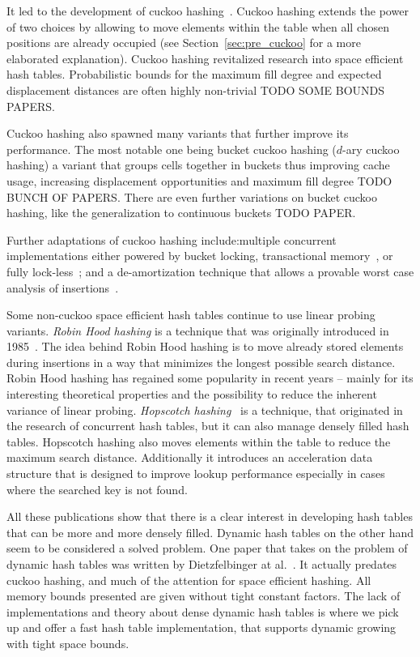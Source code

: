 \documentclass[a4paper,UKenglish]{lipics-v2016}
\begin{document}
It led to the development of cuckoo hashing~\cite{CuckooHashing}.
Cuckoo hashing extends the power of two choices by allowing to move
elements within the table when all chosen positions are already
occupied (see Section~\ref{sec:pre_cuckoo} for a more elaborated
explanation).  Cuckoo hashing revitalized research into space
efficient hash tables.  Probabilistic bounds for the maximum fill
degree and expected displacement distances are often highly
non-trivial TODO SOME BOUNDS PAPERS.

Cuckoo hashing also spawned many variants that further improve its
performance.  The most notable one being bucket cuckoo hashing
($d$-ary cuckoo hashing) a variant that groups cells together in
buckets thus improving cache usage, increasing displacement
opportunities and maximum fill degree TODO BUNCH OF PAPERS.  There are
even further variations on bucket cuckoo hashing, like the
generalization to continuous buckets TODO PAPER.

Further adaptations of cuckoo hashing include:multiple concurrent implementations either powered by bucket
locking, transactional
memory~\cite{AlgorithmicImprovementsForFastConcurrentCuckooHashing},
or fully lock-less~\cite{LockFreeCuckooHashing}; and a de-amortization
technique that allows a provable worst case analysis of
insertions~\cite{UsingAQueueToDeAmortizeCuckooHashingInHardware,
  DeAmortizedCuckooHashingProvableWorstCasePerformanceAndExperimentalResults}.

Some non-cuckoo space efficient hash tables continue to use linear
probing variants.  \emph{Robin Hood hashing} is a technique that was
originally introduced in 1985~\cite{RobinHoodHashing}. The idea behind
Robin Hood hashing is to move already stored elements during
insertions in a way that minimizes the longest possible search
distance.  Robin Hood hashing has regained some popularity in recent
years -- mainly for its interesting theoretical properties and the
possibility to reduce the inherent variance of linear probing.
\emph{Hopscotch hashing}~\cite{HopscotchHashing} is a technique, that
originated in the research of concurrent hash tables, but it can also
manage densely filled hash tables.  Hopscotch hashing also moves
elements within the table to reduce the maximum search distance.
Additionally it introduces an acceleration data structure that is
designed to improve lookup performance especially in cases where the
searched key is not found.

All these publications show that there is a clear interest in
developing hash tables that can be more and more densely filled.
Dynamic hash tables on the other hand seem to be considered a solved
problem.  One paper that takes on the problem of dynamic hash tables
was written by Dietzfelbinger at
al.~\cite{DynamicPerfectHashingUpperAndLowerBounds}.  It actually
predates cuckoo hashing, and much of the attention for space efficient
hashing.  All memory bounds presented are given without tight constant
factors.  The lack of implementations and theory about dense dynamic
hash tables is where we pick up and offer a fast hash table
implementation, that supports dynamic growing with tight space bounds.
\end{document}
